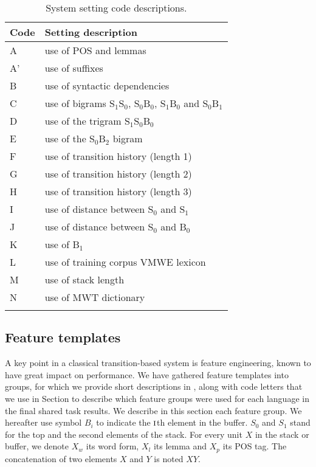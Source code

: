 \documentclass[output=paper,modfonts]{langscibook}
\begin{document}
\begin{table}[t]
\centering
\small
\begin{tabular}{ll}
\lsptoprule
\textbf{Code}&\textbf{Setting description}\\
\midrule
A &use of POS and lemmas\\
A' & use of suffixes\\
B &use of syntactic dependencies\\
C &use of bigrams S$_1$S$_0$, S$_0$B$_0$, S$_1$B$_0$ and S$_0$B$_1$\\
D &use of the trigram S$_1$S$_0$B$_0$ \\
E &use of the S$_0$B$_2$ bigram\\
F &use of transition history (length 1)\\
G &use of transition history (length 2)\\
H &use of transition history (length 3)\\
I &use of distance between S$_0$ and S$_1$\\
J &use of distance between S$_0$ and B$_0$\\
K &use of B$_1$\\
L &use of training corpus VMWE lexicon\\
M &use of stack length\\
N &use of MWT dictionary\\
\lspbottomrule
\end{tabular}
\caption{System setting code descriptions.}
\label{table:codes}
\end{table}
\subsection{Feature templates}
\label{ss:features}
A key point in a classical transition-based system is feature engineering, known to have great impact on performance. 
We have gathered feature templates into groups, for which we provide short descriptions in , along with code letters that we use in Section  to describe which feature groups were used for each language in the final shared task results. We describe in this section each feature group. We hereafter use symbol $B_i$ to indicate the $\textsc{i}$th element in the buffer. $S_0$ and $S_1$ stand for the top and the second elements of the stack. For every unit $X$ in the stack or buffer, we denote $X_w$ its word form, $X_l$ its lemma and $X_p$ its POS tag. The concatenation of two elements $X$ and $Y$ is noted $XY$. 
\end{document}
